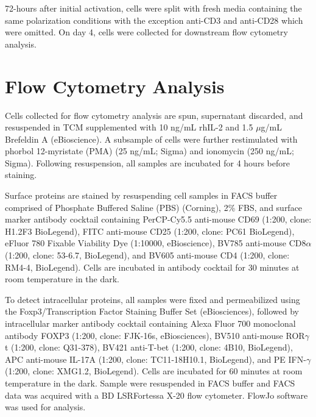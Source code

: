 72-hours after initial activation, cells were split with fresh media containing the same polarization conditions with the exception anti-CD3 and anti-CD28 which were omitted. On day 4, cells were collected for downstream flow cytometry analysis. 

\section{Flow Cytometry Analysis}
Cells collected for flow cytometry analysis are spun, supernatant discarded, and resuspended in TCM supplemented with 10 ng/mL rhIL-2 and 1.5 $\mu$g/mL Brefeldin A (eBioscience). A subsample of cells were further restimulated with phorbol 12-myristate (PMA) (25 ng/mL; Sigma) and ionomycin (250 ng/mL; Sigma). Following resuspension, all samples are incubated for 4 hours before staining. 

Surface proteins are stained by resuspending cell samples in FACS buffer comprised of Phosphate Buffered Saline (PBS) (Corning), 2\% FBS, and surface marker antibody cocktail containing PerCP-Cy5.5 anti-mouse CD69 (1:200, clone: H1.2F3 BioLegend), FITC anti-mouse CD25 (1:200, clone: PC61 BioLegend), eFluor 780 Fixable Viability Dye (1:10000, eBioscience), BV785 anti-mouse CD8$\alpha$ (1:200, clone: 53-6.7, BioLegend), and BV605 anti-mouse CD4 (1:200, clone: RM4-4, BioLegend). Cells are incubated in antibody cocktail for 30 minutes at room temperature in the dark. 

To detect intracellular proteins, all samples were fixed and permeabilized using the Foxp3/Transcription Factor Staining Buffer Set (eBiosciences), followed by intracellular marker antibody cocktail containing Alexa Fluor 700 monoclonal antibody FOXP3 (1:200, clone: FJK-16s, eBiosciences), BV510 anti-mouse ROR$\gamma$t (1:200, clone: Q31-378), BV421 anti-T-bet (1:200, clone: 4B10, BioLegend), APC anti-mouse IL-17A (1:200, clone: TC11-18H10.1, BioLegend), and PE IFN-$\gamma$ (1:200, clone: XMG1.2, BioLegend). Cells are incubated for 60 minutes at room temperature in the dark. Sample were resuspended in FACS buffer and FACS data was acquired with a BD LSRFortessa X-20 flow cytometer. FlowJo software was used for analysis. 

